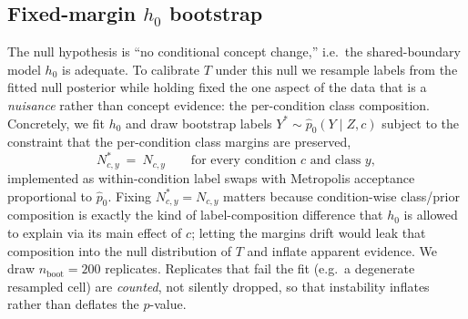 \subsection{Fixed-margin \texorpdfstring{$h_0$}{h0} bootstrap}
\label{sec:b3-bootstrap}
The null hypothesis is ``no conditional concept change,'' i.e.\ the shared-boundary model $h_0$ is adequate.
To calibrate $T$ under this null we resample labels from the fitted null posterior while holding fixed the
one aspect of the data that is a \emph{nuisance} rather than concept evidence: the per-condition class
composition. Concretely, we fit $h_0$ and draw bootstrap labels $Y^\ast\sim\hat{p}_0(Y\mid Z,c)$ subject to
the constraint that the per-condition class margins are preserved,
\begin{equation}
  N^\ast_{c,y}\ =\ N_{c,y}\qquad\text{for every condition }c\text{ and class }y,
  \label{eq:margins}
\end{equation}
implemented as within-condition label swaps with Metropolis acceptance proportional to $\hat{p}_0$. Fixing
$N^\ast_{c,y}=N_{c,y}$ matters because condition-wise class/prior composition is exactly the kind of
label-composition difference that $h_0$ is allowed to explain via its main effect of $c$; letting the
margins drift would leak that composition into the null distribution of $T$ and inflate apparent evidence.
We draw $n_{\text{boot}}=200$ replicates. Replicates that fail the fit (e.g.\ a degenerate resampled cell)
are \emph{counted}, not silently dropped, so that instability inflates rather than deflates the $p$-value.

